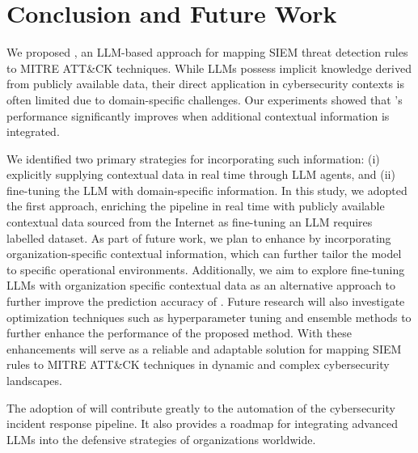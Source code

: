 \section{Conclusion and Future Work}

We proposed \methodName, an LLM-based approach for mapping SIEM threat detection rules to MITRE ATT\&CK techniques. 
While LLMs possess implicit knowledge derived from publicly available data, their direct application in cybersecurity contexts is often limited due to domain-specific challenges. 
Our experiments showed that \methodName's performance significantly improves when additional contextual information is integrated.

We identified two primary strategies for incorporating such information: (i) explicitly supplying contextual data in real time through LLM agents, and (ii) fine-tuning the LLM with domain-specific information. 
In this study, we adopted the first approach, enriching the pipeline in real time with publicly available contextual data sourced from the Internet as fine-tuning an LLM requires labelled dataset. 
As part of future work, we plan to enhance \methodName by incorporating organization-specific contextual information, which can further tailor the model to specific operational environments.
Additionally, we aim to explore fine-tuning LLMs with organization specific contextual data as an alternative approach to further improve the prediction accuracy of \methodName. 
Future research will also investigate optimization techniques such as hyperparameter tuning and ensemble methods to further enhance the performance of the proposed method. 
 With these enhancements \methodName will serve as a reliable and adaptable solution for mapping SIEM rules to MITRE ATT\&CK techniques in dynamic and complex cybersecurity landscapes.

The adoption of \methodName will contribute greatly to the automation of the cybersecurity incident response pipeline.
It also provides a roadmap for integrating advanced LLMs into the defensive strategies of organizations worldwide.
% 